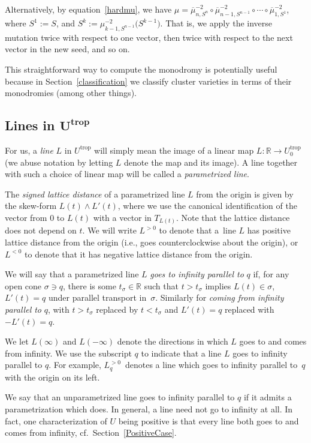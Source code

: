\documentclass[pdftex]{sigma}
\numberwithin{equation}{section}
\numberwithin{figure}{section}
\numberwithin{table}{section}
\DeclareMathOperator{\trop}{trop}
\let\?=\overline
\let\bb=\mathbb
\let\rar=\rightarrow
\theoremstyle{definition}
\begin{document}
Alternatively, by equation~\eqref{hardmu}, we have $\mu = \?{\mu}_{n,S^{n}}^{-2} \circ \?{\mu}_{n-1,S^{n-1}}^{-2} \circ \cdots \circ \?{\mu}_{1,S^{1}}^{-2}$, where $S^1:=S$, and $S^{k}:= \mu_{k-1,S^{n-1}}^{-2} \big(S^{k-1}\big)$. That is, we apply the inverse mutation twice with respect to one vector, then twice with respect to the next vector in the new seed, and so on.

This straightforward way to compute the monodromy is potentially useful because in Section~\ref{classification} we classify cluster varieties in terms of their monodromies (among other things).

\subsection[Lines in $U^{\trop}$]{Lines in $\boldsymbol{U^{\trop}}$} \label{lines}

For us, a {\it line} $L$ in $U^{\trop}$ will simply mean the image of a linear map $L\colon \bb{R}\rar U^{\trop}_0$ (we abuse notation by letting $L$ denote the map and its image). A line together with such a choice of linear map will be called a {\it parametrized line}.

The {\it signed lattice distance} of a parametrized line $L$ from the origin is given by the skew-form $L(t)\wedge L'(t)$, where we use the canonical identification of the vector from $0$ to $L(t)$ with a vector in $T_{L(t)}$. Note that the lattice distance does not depend on $t$. We will write $L^{>0}$ to denote that a~line $L$ has positive lattice distance from the origin (i.e., goes counterclockwise about the origin), or~$L^{<0}$ to denote that it has negative lattice distance from the origin.

We will say that a parametrized line $L$ {\it goes to infinity parallel to} $q$ if, for any open cone $\sigma \ni q$, there is some $t_\sigma\in \bb{R}$ such that $t>t_{\sigma}$ implies $L(t) \in \sigma$, $L'(t)=q$ under parallel transport in~$\sigma$. Similarly for {\it coming from infinity parallel to} $q$, with $t>t_{\sigma}$ replaced by $t<t_{\sigma}$ and $L'(t)=q$ replaced with $-L'(t)=q$.

We let $L(\infty)$ and $L(-\infty)$ denote the directions in which $L$ goes to and comes from infinity. We use the subscript $q$ to indicate that a line $L$ goes to infinity parallel to $q$. For example, $L_q^{>0}$~denotes a line which goes to infinity parallel to~$q$ with the origin on its left.

We say that an unparametrized line goes to infinity parallel to $q$ if it admits a parametrization which does. In general, a line need not go to infinity at all. In fact, one characterization of $U$ being positive is that every line both goes to and comes from infinity, cf.\ Section~\ref{PositiveCase}.
\end{document}
